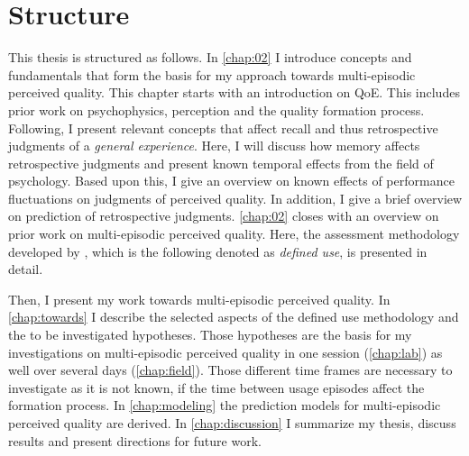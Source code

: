 \section{Structure}
This thesis is structured as follows.
In \autoref{chap:02} I introduce concepts and fundamentals that form the basis for my approach towards multi-episodic perceived quality.
This chapter starts with an introduction on \ac{QoE}.
This includes prior work on psychophysics, perception and the quality formation process.
Following, I present relevant concepts that affect recall and thus retrospective judgments of a \emph{general experience}.
Here, I will discuss how memory affects retrospective judgments and present known temporal effects from the field of psychology.
Based upon this, I give an overview on known effects of performance fluctuations on judgments of perceived quality.
In addition, I give a brief overview on prediction of retrospective judgments.
\autoref{chap:02} closes with an overview on prior work on multi-episodic perceived quality.
Here, the assessment methodology developed by \citet{moller_single-call_2011}, which is the following denoted as \emph{defined use}, is presented in detail.

Then, I present my work towards multi-episodic perceived quality. %
In \autoref{chap:towards} I describe the selected aspects of the defined use methodology and the to be investigated hypotheses.
Those hypotheses are the basis for my investigations on multi-episodic perceived quality in one session (\autoref{chap:lab}) as well over several days (\autoref{chap:field}).
Those different time frames are necessary to investigate as it is not known, if the time between usage episodes affect the formation process.
In \autoref{chap:modeling} the prediction models for multi-episodic perceived quality are derived.
In \autoref{chap:discussion} I summarize my thesis, discuss results and present directions for future work.